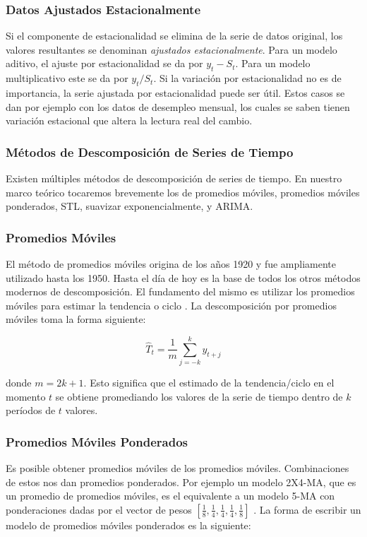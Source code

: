 \subsubsection{Datos Ajustados Estacionalmente}
Si el componente de estacionalidad se elimina de la serie de datos original, los valores resultantes se denominan \emph{ajustados estacionalmente}. Para un modelo aditivo, el ajuste por estacionalidad se da por $y_t - S_t$. Para un modelo multiplicativo este se da por $y_t/S_t$. Si la variación por estacionalidad no es de importancia, la serie ajustada por estacionalidad puede ser útil. Estos casos se dan por ejemplo con los datos de desempleo mensual, los cuales se saben tienen variación estacional que altera la lectura real del cambio.

\subsubsection{Métodos de Descomposición de Series de Tiempo}
Existen múltiples métodos de descomposición de series de tiempo. En nuestro marco teórico tocaremos brevemente los de promedios móviles, promedios móviles ponderados, STL, suavizar exponencialmente, y ARIMA.

\subsubsection{Promedios Móviles}

El método de promedios móviles origina de los años 1920 y fue ampliamente utilizado hasta los 1950. Hasta el día de hoy es la base de todos los otros métodos modernos de descomposición. El fundamento del mismo es utilizar los promedios móviles para estimar la tendencia o ciclo \cite{hyndman}. La descomposición por promedios móviles toma la forma siguiente:

\[ \hat{T}_{t} = \frac{1}{m} \sum_{j = -k}^{k} y_{t + j}  \]

donde $m=2k+1$. Esto significa que el estimado de la tendencia/ciclo en el momento $t$ se obtiene promediando los valores de la serie de tiempo dentro de $k$ períodos de $t$ valores.

\subsubsection{Promedios Móviles Ponderados}
Es posible obtener promedios móviles de los promedios móviles. Combinaciones de estos nos dan promedios ponderados. Por ejemplo un modelo 2X4-MA, que es un promedio de promedios móviles, es el equivalente a un modelo 5-MA con ponderaciones dadas por el vector de pesos $[\frac{1}{8}, \frac{1}{4}, \frac{1}{4}, \frac{1}{4}, \frac{1}{8}]$ \cite{hyndman}. La forma de escribir un modelo de promedios móviles ponderados es la siguiente:

